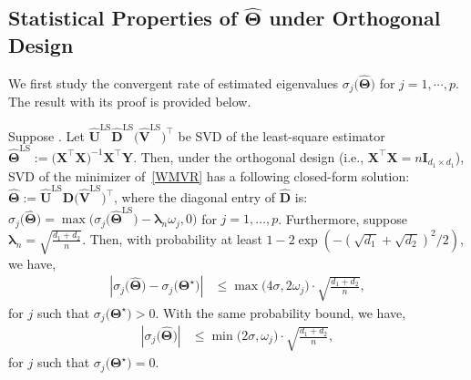 \documentclass[alpha-refs]{wiley-article}
\begin{document}
\subsection{Statistical Properties of $\widehat{\boldsymbol{\Theta}}$ under Orthogonal Design}
We first study the convergent rate of estimated eigenvalues $\sigma_{j}\big(\widehat{\boldsymbol{\Theta}}\big)$ for $j = 1, \cdots, p$.
The result with its proof is provided below.

\begin{proposition} \label{clsed-form}
    Suppose .
    Let $\widehat{\boldsymbol{U}}^{\text{LS}}\widehat{\boldsymbol{D}}^{\text{LS}}\big(\widehat{\boldsymbol{V}}^{\text{LS}}\big)^{\top}$ be SVD of the least-square estimator $\widehat{\boldsymbol{\Theta}}^{\text{LS}}:=\big(\boldsymbol{X}^{\top}\boldsymbol{X}\big)^{-1}\boldsymbol{X}^{\top}\boldsymbol{Y}$.
    Then, under the orthogonal design (i.e., $\boldsymbol{X}^{\top}\boldsymbol{X}=n\boldsymbol{I}_{d_{1} \times d_{1}}$), SVD of the minimizer of~\eqref{WMVR} has a following closed-form solution:
    $\widehat{\boldsymbol{\Theta}} := \widehat{\boldsymbol{U}}^{\text{LS}}\widehat{\boldsymbol{D}}\big(\widehat{\boldsymbol{V}}^{\text{LS}}\big)^{\top}$,
    where the diagonal entry of $\widehat{\boldsymbol{D}}$ is:
    $\sigma_{j}\big(\widehat{\boldsymbol{\Theta}}\big) = \max \big(  \sigma_{j}\big(\widehat{\boldsymbol{\Theta}}^{\text{LS}}\big)-\boldsymbol{\lambda}_{n} \omega_{j},0 \big)$ for $j=1,\dots,p$.
    Furthermore, suppose $\boldsymbol{\lambda}_{n}=\sqrt{\frac{d_{1}+d_{2}}{n}}$.
    Then, with probability at least $1-2\exp(-(\sqrt{d_{1}}+\sqrt{d_{2}})^{2}/2)$, we have,
    \begin{align} \label{sing1}
        \left| \sigma_{j}\big(\widehat{\boldsymbol{\Theta}}\big)-\sigma_{j}\big(\boldsymbol{\Theta}^{\star}\big)\right|
        &\leq \max\big(4\sigma,2\omega_{j}\big)\cdot \sqrt{\frac{d_{1}+d_{2}}{n}},
    \end{align}
    for $j$ such that $\sigma_{j}\big(\boldsymbol{\Theta}^{\star}\big)>0$.
    With the same probability bound, we have,
    \begin{align} \label{sing2}
        \left| \sigma_{j}\big(\widehat{\boldsymbol{\Theta}}\big)\right|
        &\leq \min\big(2\sigma,\omega_{j}\big)\cdot \sqrt{\frac{d_{1}+d_{2}}{n}},
    \end{align}
    for $j$ such that $\sigma_{j}\big(\boldsymbol{\Theta}^{\star}\big)=0$.
\end{proposition}
\end{document}
